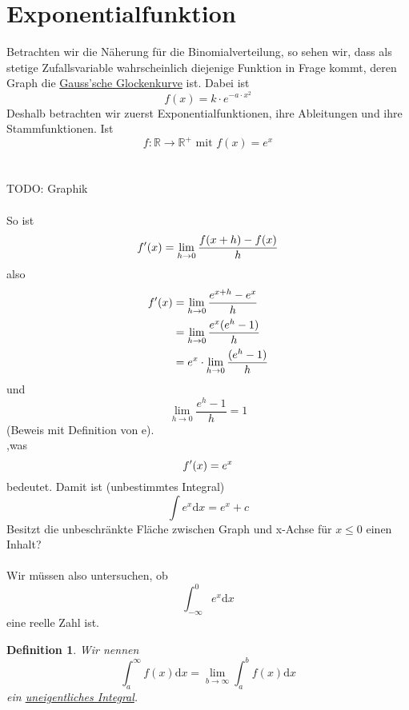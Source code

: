 \documentclass{report}
\newtheorem{mydef}{Definition}
\begin{document}
\section{Exponentialfunktion}
Betrachten wir die Näherung für die Binomialverteilung, so sehen wir, dass als stetige Zufallsvariable wahrscheinlich diejenige Funktion in Frage kommt, deren Graph die \underline{Gauss\rq{}sche Glockenkurve} ist. Dabei ist
\begin{equation}
f(x) = k \cdot e^{-a \cdot x^2}
\end{equation}
Deshalb betrachten wir zuerst Exponentialfunktionen, ihre Ableitungen und ihre Stammfunktionen. Ist
\begin{equation}
f: \mathbb{R} \longrightarrow \mathbb{R}^{+} \mbox{ mit } f(x) = e^x
\end{equation}
\\\\TODO: Graphik\\\\
So ist
\begin{equation}
f\rq{}(x)= \lim_{h \to 0}{\frac{f(x+h) - f(x)}{h}}
\end{equation}
also
\begin{align*}
f\rq{}(x)&= \lim_{h \to 0}{\frac{e^{x+h} - e^x}{h}}\\
&= \lim_{h \to 0}{\frac{e^{x}(e^h - 1)}{h}}\\
&= e^x \cdot \lim_{h \to 0}{\frac{(e^h - 1)}{h}}\\
\end{align*}
und
\begin{equation}
\lim_{h \to 0}{\frac{e^h - 1}{h}} = 1
\end{equation}
(Beweis mit Definition von e).\\
,was
\begin{equation}
f\rq{}(x) = e^x
\end{equation}
bedeutet. Damit ist (unbestimmtes Integral)
\begin{equation}
\int e^x \mathrm{d}x = e^x + c
\end{equation}
Besitzt die unbeschränkte Fläche zwischen Graph und x-Achse für $x \leq 0$ einen Inhalt?\\\\
Wir müssen also untersuchen, ob
\begin{equation}
\int_{-\infty}^{0} e^x \mathrm{d}x
\end{equation}
eine reelle Zahl ist.
\begin{mydef}
Wir nennen
\begin{equation}
\int_{a}^{\infty} f(x) \mathrm{d}x = \lim_{b \to \infty} \int_{a}^{b} f(x) \mathrm{d}x
\end{equation}
ein \underline{uneigentliches Integral}.
\end{mydef}
\end{document}
